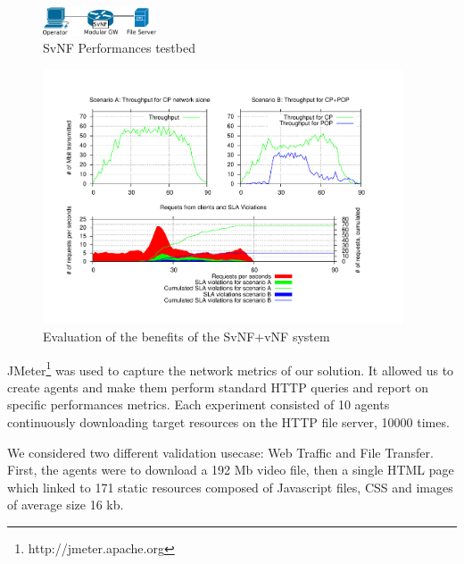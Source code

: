\begin{figure}
  \begin{center}
    \includegraphics[width=0.30\textwidth]{fig/testbed.pdf}
  \end{center}
  \caption{ SvNF Performances testbed
    \label{fig:testbed}
  }
\end{figure}	


\begin{figure}
  \begin{center}
    \includegraphics[width=0.95\textwidth]{fig/CP+POP_evaluation.pdf}
  \end{center}
  \caption{ Evaluation of the benefits of the SvNF+vNF system
    \label{fig:cppopeval}
  }
\end{figure}	







JMeter\footnote{http://jmeter.apache.org} was used to capture the network metrics of our solution.
It allowed us to create agents and make them perform standard HTTP queries and report on specific performances metrics. Each experiment consisted of 10 agents continuously downloading target resources on the HTTP file server, 10000 times.

We considered two different validation usecase: Web Traffic and File Transfer. First, the agents were to download a 192 Mb video file, then a single HTML page which linked to 171 static resources composed of Javascript files, CSS and images of average size 16 kb.


